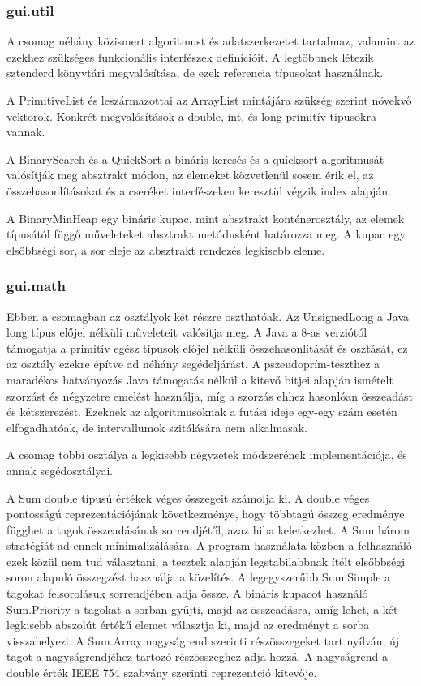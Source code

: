 \subsubsection{gui.util}

A csomag néhány közismert algoritmust és adatszerkezetet tartalmaz, valamint az ezekhez szükséges funkcionális interfészek definícióit.
A legtöbbnek létezik sztenderd könyvtári megvalósítása, de ezek referencia típusokat használnak.

A PrimitiveList és leszármazottai az ArrayList mintájára szükség szerint növekvő vektorok. Konkrét megvalósítások
a double, int, és long primitív típusokra vannak.

A BinarySearch és a QuickSort a bináris keresés és a quicksort algoritmusát valósítják meg absztrakt módon, az elemeket közvetlenül sosem érik el, az összehasonlításokat
és a cseréket interfészeken keresztül végzik index alapján.

A BinaryMinHeap egy bináris kupac, mint absztrakt konténerosztály, az elemek típusától függő műveleteket absztrakt metódusként határozza meg.
A kupac egy elsőbbségi sor, a sor eleje az absztrakt rendezés legkisebb eleme.

\subsubsection{gui.math}

Ebben a csomagban az osztályok két részre oszthatóak.
Az UnsignedLong a Java long típus előjel nélküli
műveleteit valósítja meg.
A Java a 8-as verziótól támogatja a primitív egész típusok előjel nélküli összehasonlítását és osztását, ez az osztály ezekre építve ad néhány segédeljárást.
A pszeudoprím-teszthez a maradékos hatványozás Java támogatás nélkül a kitevő bitjei alapján ismételt szorzást és négyzetre emelést használja, míg a szorzás ehhez hasonlóan összeadást és kétszerezést. Ezeknek az algoritmusoknak a futási ideje egy-egy szám esetén elfogadhatóak, de intervallumok szitálására nem alkalmasak.

A csomag többi osztálya a legkisebb négyzetek módszerének implementációja, és annak segédosztályai.

A Sum double típusú értékek véges összegeit számolja ki.
A double véges pontosságú reprezentációjának következménye, hogy többtagú összeg eredménye függhet a tagok összeadásának sorrendjétől, azaz hiba keletkezhet.
A Sum három stratégiát ad ennek minimalizálására.
A program használata közben a felhasználó ezek közül nem tud választani, {\color{red}a tesztek alapján legstabilabbnak ítélt elsőbbségi soron alapuló} összegzést használja a közelítés.
A legegyszerűbb Sum.Simple a tagokat felsorolásuk sorrendjében adja össze. 
A bináris kupacot használó Sum.Priority a tagokat a sorban gyűjti, majd az összeadásra, amíg lehet, a két legkisebb abszolút értékű elemet választja ki, majd az eredményt a sorba visszahelyezi.
A Sum.Array nagyságrend szerinti részösszegeket tart nyílván, új tagot a nagyságrendjéhez tartozó részösszeghez adja hozzá. A nagyságrend a double érték IEEE 754 szabvány szerinti reprezentció kitevője.

